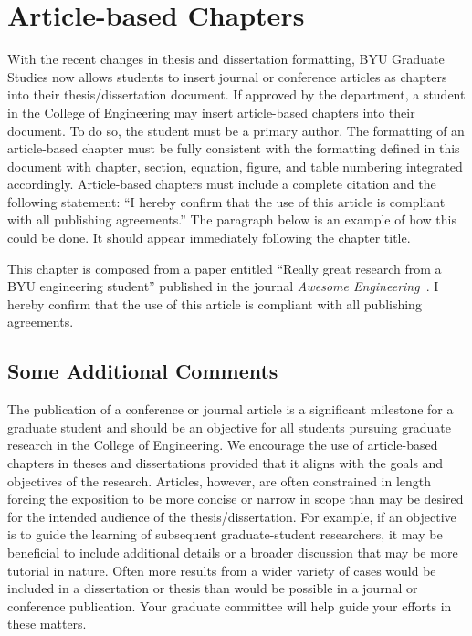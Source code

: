 \chapter{Article-based Chapters}
\label{ch:article_based_chap}

With the recent changes in thesis and dissertation formatting, BYU Graduate Studies now allows students to insert journal or conference articles as chapters into their thesis/dissertation document. If approved by the department, a student in the College of Engineering may insert article-based chapters into their document. To do so, the student must be a primary author. The formatting of an article-based chapter must be fully consistent with the formatting defined in this document with chapter, section, equation, figure, and table numbering integrated accordingly. Article-based chapters must include a complete citation and the following statement: ``I hereby confirm that the use of this article is compliant with all publishing agreements.'' The paragraph below is an example of how this could be done. It should appear immediately following the chapter title.

\vspace{0.1in}
\noindent This chapter is composed from a paper entitled ``Really great research from a BYU engineering student'' published in the journal {\itshape Awesome Engineering}~\autocite{StudentRP20}. I hereby confirm that the use of this article is compliant with all publishing agreements.



\section{Some Additional Comments}
The publication of a conference or journal article is a significant milestone for a graduate  student and should be an objective for all students pursuing graduate research in the College of Engineering. We encourage the use of article-based chapters in theses and dissertations provided that it aligns with the goals and objectives of the research. Articles, however, are often constrained in length forcing the exposition to be more concise or narrow in scope than may be desired for the intended audience of the thesis/dissertation. For example, if an objective is to guide the learning of subsequent graduate-student researchers, it may be beneficial to include additional details or a broader discussion that may be more tutorial in nature. Often more results from a wider variety of cases would be included in a dissertation or thesis than would be possible in a journal or conference publication. Your graduate committee will help guide your efforts in these matters.
